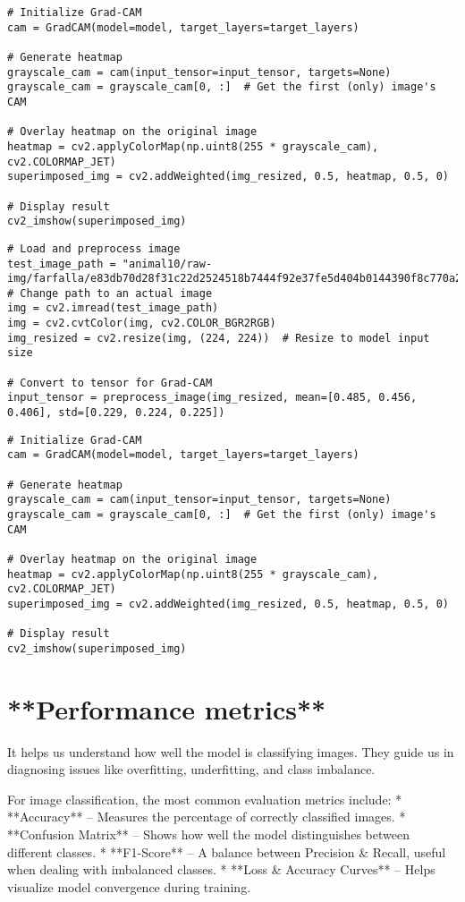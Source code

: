 \documentclass{article}
\begin{document}
\begin{verbatim}
# Initialize Grad-CAM
cam = GradCAM(model=model, target_layers=target_layers)

# Generate heatmap
grayscale_cam = cam(input_tensor=input_tensor, targets=None)
grayscale_cam = grayscale_cam[0, :]  # Get the first (only) image's CAM

# Overlay heatmap on the original image
heatmap = cv2.applyColorMap(np.uint8(255 * grayscale_cam), cv2.COLORMAP_JET)
superimposed_img = cv2.addWeighted(img_resized, 0.5, heatmap, 0.5, 0)

# Display result
cv2_imshow(superimposed_img)
\end{verbatim}

\begin{verbatim}
# Load and preprocess image
test_image_path = "animal10/raw-img/farfalla/e83db70d28f31c22d2524518b7444f92e37fe5d404b0144390f8c770a2e9b5_640.jpg"  # Change path to an actual image
img = cv2.imread(test_image_path)
img = cv2.cvtColor(img, cv2.COLOR_BGR2RGB)
img_resized = cv2.resize(img, (224, 224))  # Resize to model input size

# Convert to tensor for Grad-CAM
input_tensor = preprocess_image(img_resized, mean=[0.485, 0.456, 0.406], std=[0.229, 0.224, 0.225])
\end{verbatim}

\begin{verbatim}
# Initialize Grad-CAM
cam = GradCAM(model=model, target_layers=target_layers)

# Generate heatmap
grayscale_cam = cam(input_tensor=input_tensor, targets=None)
grayscale_cam = grayscale_cam[0, :]  # Get the first (only) image's CAM

# Overlay heatmap on the original image
heatmap = cv2.applyColorMap(np.uint8(255 * grayscale_cam), cv2.COLORMAP_JET)
superimposed_img = cv2.addWeighted(img_resized, 0.5, heatmap, 0.5, 0)

# Display result
cv2_imshow(superimposed_img)
\end{verbatim}

\section{**Performance metrics**}

It helps us understand how well the model is classifying images. They guide us in diagnosing issues like overfitting, underfitting, and class imbalance.

For image classification, the most common evaluation metrics include:
*  **Accuracy** – Measures the percentage of correctly classified images.
* **Confusion Matrix** – Shows how well the model distinguishes between different classes.
* **F1-Score** – A balance between Precision & Recall, useful when dealing with imbalanced classes.
* **Loss & Accuracy Curves** – Helps visualize model convergence during training.
\end{document}
